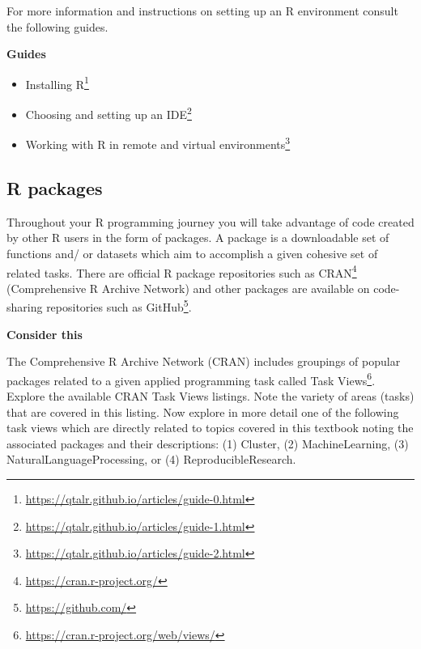 \documentclass[
  letterpaper,
]{latex/krantz}
\providecommand{\tightlist}{%
  \setlength{\itemsep}{0pt}\setlength{\parskip}{0pt}}\usepackage{longtable,booktabs,array}
\DeclareRobustCommand{\href}[2]{#2\footnote{\url{#1}}}
\begin{document}
For more information and instructions on setting up an R environment
consult the following guides.

\begin{tcolorbox}[enhanced jigsaw, arc=.35mm, leftrule=.75mm, rightrule=.15mm, opacityback=0, colback=white, breakable, bottomrule=.15mm, left=2mm, toprule=.15mm]

\textbf{ Guides}

\begin{itemize}
\tightlist
\item
  \href{https://qtalr.github.io/articles/guide-0.html}{Installing R}
\item
  \href{https://qtalr.github.io/articles/guide-1.html}{Choosing and
  setting up an IDE}
\item
  \href{https://qtalr.github.io/articles/guide-2.html}{Working with R in
  remote and virtual environments}
\end{itemize}

\end{tcolorbox}

\hypertarget{r-packages}{%
\subsection*{R packages}\label{r-packages}}

Throughout your R programming journey you will take advantage of code
created by other R users in the form of packages. A package is a
downloadable set of functions and/ or datasets which aim to accomplish a
given cohesive set of related tasks. There are official R package
repositories such as \href{https://cran.r-project.org/}{CRAN}
(Comprehensive R Archive Network) and other packages are available on
code-sharing repositories such as \href{https://github.com/}{GitHub}.

\begin{tcolorbox}[enhanced jigsaw, arc=.35mm, leftrule=.75mm, rightrule=.15mm, opacityback=0, colback=white, breakable, bottomrule=.15mm, left=2mm, toprule=.15mm]

\textbf{ Consider this}

The Comprehensive R Archive Network (CRAN) includes groupings of popular
packages related to a given applied programming task called
\href{https://cran.r-project.org/web/views/}{Task Views}. Explore the
available CRAN Task Views listings. Note the variety of areas (tasks)
that are covered in this listing. Now explore in more detail one of the
following task views which are directly related to topics covered in
this textbook noting the associated packages and their descriptions: (1)
Cluster, (2) MachineLearning, (3) NaturalLanguageProcessing, or (4)
ReproducibleResearch.

\end{tcolorbox}
\end{document}

